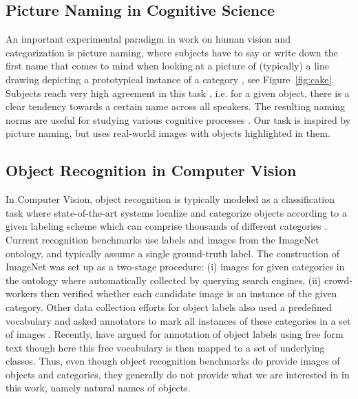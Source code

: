 \subsection{Picture Naming in Cognitive Science}

An important experimental paradigm in work on human vision and categorization is picture naming, where subjects have to say or write down the first name that comes to mind when looking at a picture of (typically) a line drawing depicting a prototypical instance of a category \cite{snodgrass,rossion2004revisiting}, see Figure\ \ref{fig:cake}.
Subjects reach very high agreement in this task \cite{rossion2004revisiting}, i.e. for a given object, there is a clear tendency towards a certain name across all speakers.
The resulting naming norms are useful for studying various cognitive processes \cite{humphreys1988cascade}.
Our task is inspired by picture naming, but uses real-world images with objects highlighted in them.

\subsection{Object Recognition in Computer Vision}

In Computer Vision, object recognition is typically modeled as a classification task where state-of-the-art systems localize and categorize objects according to a given labeling scheme which can comprise thousands of different categories  \cite{googlenet,ILSVRC15}. 
Current recognition benchmarks use labels and images from the ImageNet \cite{imagenet_cvpr09} ontology, and typically assume a single ground-truth label. 
The construction of ImageNet was set up as a two-stage procedure: (i) images for given categories in the ontology where automatically collected by querying search engines, (ii) crowd-workers then verified whether each candidate image is an instance of the given category.
Other data collection efforts for object labels also used a predefined vocabulary and asked annotators to mark all instances of these categories in a set of images \cite{mscoco,OpenImages}. 
Recently,  have argued for annotation of object labels using free form text though here this free vocabulary is then mapped to a set of underlying classes.
Thus, even though object recognition benchmarks do provide images of objects and categories, they generally do not provide what we are interested in in this work, namely natural names of objects.



